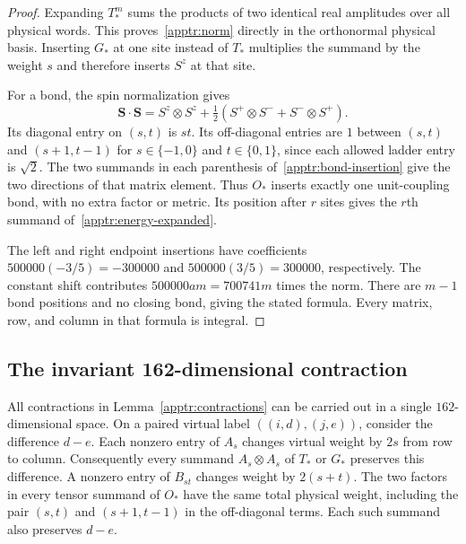 \documentclass[11pt]{article}
\theoremstyle{remark}
\numberwithin{equation}{section}
\begin{document}
\begin{proof}
Expanding $T_*^m$ sums the products of two identical real amplitudes
over all physical words.  This proves~\eqref{apptr:norm} directly in
the orthonormal physical basis.  Inserting $G_*$ at one site instead
of $T_*$ multiplies the summand by the weight $s$ and therefore
inserts $S^z$ at that site.

For a bond, the spin normalization gives
\[
 \mathbf S\cdot\mathbf S
 =S^z\otimes S^z+\tfrac12
   (S^+\otimes S^-+S^-\otimes S^+).
\]
Its diagonal entry on $(s,t)$ is $st$.  Its off-diagonal entries are
$1$ between $(s,t)$ and $(s+1,t-1)$ for
$s\in\{-1,0\}$ and $t\in\{0,1\}$, since each allowed ladder
entry is $\sqrt2$.  The two summands in each parenthesis
of~\eqref{apptr:bond-insertion} give the two directions of that
matrix element.  Thus $O_*$ inserts exactly one unit-coupling bond,
with no extra factor or metric.  Its position after $r$ sites gives
the $r$th summand of~\eqref{apptr:energy-expanded}.

The left and right endpoint insertions have coefficients
$500000(-3/5)=-300000$ and $500000(3/5)=300000$, respectively.
The constant shift contributes $500000am=700741m$ times the norm.
There are $m-1$ bond positions and no closing bond, giving the stated
formula.  Every matrix, row, and column in that formula is integral.
\end{proof}

\subsection{The invariant 162-dimensional contraction}

All contractions in Lemma~\ref{apptr:contractions} can be carried out
in a single $162$-dimensional space.  On a paired virtual label
$((i,d),(j,e))$, consider the difference $d-e$.  Each nonzero entry
of $A_s$ changes virtual weight by $2s$ from row to column.
Consequently every summand $A_s\otimes A_s$ of $T_*$ or $G_*$
preserves this difference.  A nonzero entry of $B_{st}$ changes
weight by $2(s+t)$.  The two factors in every tensor summand of
$O_*$ have the same total physical weight, including the pair
$(s,t)$ and $(s+1,t-1)$ in the off-diagonal terms.  Each such
summand also preserves $d-e$.
\end{document}
